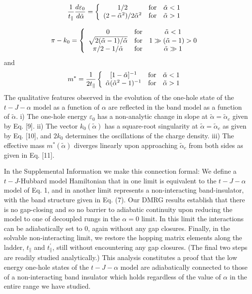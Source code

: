 \documentclass[aps,prb,twocolumn]{revtex4}
\def\be{\begin{equation}}       \def\ee{\end{equation}}
\begin{document}
\be
\frac {1}{t_\parallel} \frac {d \varepsilon_0}{d\tilde\alpha}=
\left\{
\begin{array}{ccc}
1/2 &  {\rm for}  & \tilde \alpha< 1  \\
(2-\tilde \alpha^2)/2\tilde\alpha^2
& {\rm for}   &   \tilde \alpha > 1
\end{array}
\right. 
\ee

  \be
\label{qofx}
\pi - k_0= 
\left\{
\begin{array}{ccc}
 0 &  {\rm for}  & \tilde \alpha< 1  \\
 \sqrt{
 {2(\tilde \alpha-1)}/ {\tilde \alpha}} 
  & {\rm for}  &  1 \gg (\tilde \alpha-1) >0 \\
\pi/ 2 - 
{1}/ {\tilde \alpha} 
& {\rm for}   &   \tilde \alpha \gg 1
\end{array}
\right. 
\ee
and
\be
\label{mstar}
 {m^*} =\frac 1 {2t_{\parallel}}
\left\{
\begin{array}{ccc}
  [1-\tilde \alpha]^{-1} &  {\rm for}  & \tilde \alpha <1  \\
{ \tilde\alpha
}{(\tilde \alpha^2 - 1)^{-1}} &  {\rm for}   &   \tilde\alpha > 1
\end{array}
\right. 
\ee 
The qualitative features 
observed in the evolution of the one-hole state  
  of the $t-J-\alpha$ model as a function of  $\alpha$
are 
reflected in the band model as a function of $\tilde\alpha $. i) The one-hole energy   $  \varepsilon_0 $  has
a non-analytic change in  slope  at $\tilde\alpha=\tilde\alpha_c $  given
by Eq. [9]. ii) The vector $ k_0(\tilde\alpha)$ has a square-root singularity
at $\tilde\alpha= \tilde\alpha_c$ as given by Eq. [10], and $2k_0$  determines the oscillations of the charge density. 
 iii) The effective  mass $m^{*}(\tilde\alpha)$ diverges linearly upon approaching $\tilde\alpha_c$
from both sides as given in Eq. [11].

In the Supplemental Information we make this connection formal:  We define a
$t-J$-Hubbard model Hamiltonian that in one limit is equivalent to the
$t-J-\alpha$ model of Eq. 1, and in another limit represents a non-interacting
band-insulator, with the band structure given in Eq. (7).  Our DMRG results
establish that there is no gap-closing 
 and so  no barrier to adiabatic
continuity 
 upon reducing the model to one of decoupled rungs in the $\alpha=0$
limit.  In this limit the interactions can be adiabatically set to 0, again
without any gap closures.  Finally, in the solvable non-interacting limit, we
restore the hopping matrix elements along the ladder, $t_\parallel$ and
$t_\parallel^\prime$, still without encountering any gap closures.  (The final
two steps are readily studied analytically.)  This analysis constitutes a proof
that the low energy one-hole states of the $t-J-\alpha$ model are adiabatically
connected to those of a non-interacting band insulator which holds regardless
of the value of $\alpha$ in the entire range we have studied.
\end{document}
